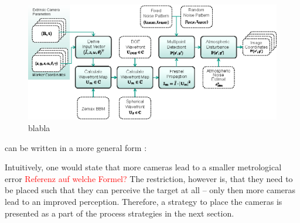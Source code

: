 \documentclass[5p,times,procedia]{elsarticle}
\begin{document}
\begin{figure}[!htb]
	\centering
	\includegraphics[width=\columnwidth]{graphics/OpticalSimulation.eps}
	\caption{blabla}
\end{figure}




can be written in a more general form \cite{Cox2006}:

% 
Intuitively, one would state that more cameras lead to a smaller metrological error
\textcolor{red}{Referenz auf welche Formel?}
The restriction, however is, that they need to be placed such that they can perceive the target at all -- only then more cameras lead to an improved perception.
Therefore, a strategy to place the cameras is presented as a part of the process strategies in the next section.
\end{document}
